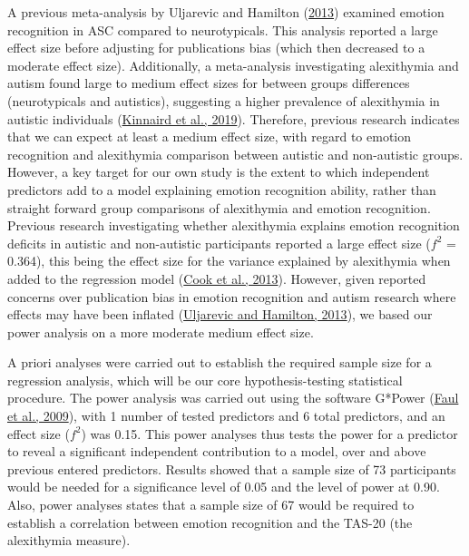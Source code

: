 \documentclass[
]{article}
\begin{document}
A previous meta-analysis by Uljarevic and Hamilton (\protect\hyperlink{ref-uljarevic2013a}{2013}) examined emotion recognition in ASC compared to neurotypicals. This analysis reported a large effect size before adjusting for publications bias (which then decreased to a moderate effect size). Additionally, a meta-analysis investigating alexithymia and autism found large to medium effect sizes for between groups differences (neurotypicals and autistics), suggesting a higher prevalence of alexithymia in autistic individuals (\protect\hyperlink{ref-kinnaird2019a}{Kinnaird et al., 2019}). Therefore, previous research indicates that we can expect at least a medium effect size, with regard to emotion recognition and alexithymia comparison between autistic and non-autistic groups. However, a key target for our own study is the extent to which independent predictors add to a model explaining emotion recognition ability, rather than straight forward group comparisons of alexithymia and emotion recognition. Previous research investigating whether alexithymia explains emotion recognition deficits in autistic and non-autistic participants reported a large effect size (\(f^2\) = 0.364), this being the effect size for the variance explained by alexithymia when added to the regression model (\protect\hyperlink{ref-cook2013a}{Cook et al., 2013}). However, given reported concerns over publication bias in emotion recognition and autism research where effects may have been inflated (\protect\hyperlink{ref-uljarevic2013a}{Uljarevic and Hamilton, 2013}), we based our power analysis on a more moderate medium effect size.

A priori analyses were carried out to establish the required sample size for a regression analysis, which will be our core hypothesis-testing statistical procedure. The power analysis was carried out using the software G*Power (\protect\hyperlink{ref-faul2009a}{Faul et al., 2009}), with 1 number of tested predictors and 6 total predictors, and an effect size (\(f^2\)) was 0.15. This power analyses thus tests the power for a predictor to reveal a significant independent contribution to a model, over and above previous entered predictors. Results showed that a sample size of 73 participants would be needed for a significance level of 0.05 and the level of power at 0.90. Also, power analyses states that a sample size of 67 would be required to establish a correlation between emotion recognition and the TAS-20 (the alexithymia measure).
\end{document}
